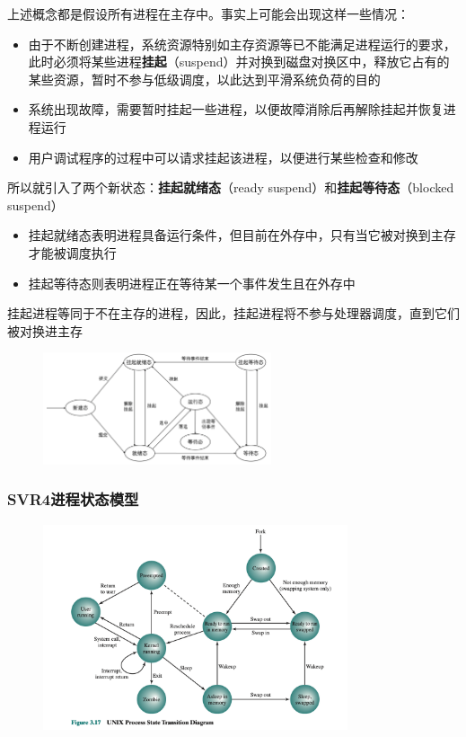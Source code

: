 \documentclass[cs4size,a4paper,10pt]{ctexart}
\begin{document}
	上述概念都是假设所有进程在主存中。事实上可能会出现这样一些情况：
	\begin{itemize}
		\item 由于不断创建进程，系统资源特别如主存资源等已不能满足进程运行的要求，此时必须将某些进程\textbf{挂起}（suspend）并对换到磁盘对换区中，释放它占有的某些资源，暂时不参与低级调度，以此达到平滑系统负荷的目的
		\item 系统出现故障，需要暂时挂起一些进程，以便故障消除后再解除挂起并恢复进程运行
		\item 用户调试程序的过程中可以请求挂起该进程，以便进行某些检查和修改
	\end{itemize}

	所以就引入了两个新状态：\textbf{挂起就绪态}（ready suspend）和\textbf{挂起等待态}（blocked suspend）
	\begin{itemize}
		\item 挂起就绪态表明进程具备运行条件，但目前在外存中，只有当它被对换到主存才能被调度执行
		\item 挂起等待态则表明进程正在等待某一个事件发生且在外存中
	\end{itemize}

	挂起进程等同于不在主存的进程，因此，挂起进程将不参与处理器调度，直到它们被对换进主存

	\begin{figure}[H]
		\centering
		\includegraphics[width=0.6\textwidth]{img/2.3.1.2.2}
	\end{figure}

	\subsubsection{SVR4进程状态模型}
	\begin{figure}[H]
		\centering
		\includegraphics[width=0.8\textwidth]{img/2.3.1.3}
	\end{figure}
\end{document}
